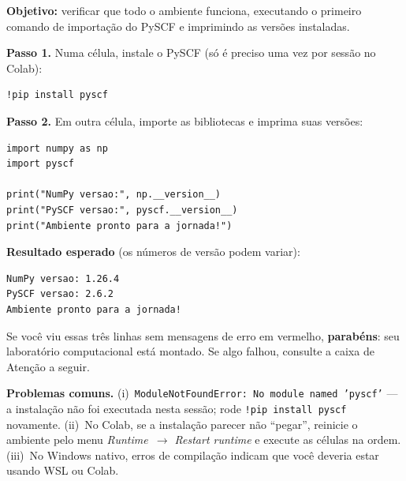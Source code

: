 \documentclass[11pt,a4paper,openany]{book}
\newcommand{\code}[1]{\texttt{#1}}
\newcommand{\pyscf}{\textsf{PySCF}}
\begin{document}
\begin{caixamaos}
\textbf{Objetivo:} verificar que todo o ambiente funciona, executando o primeiro
comando de importação do \pyscf{} e imprimindo as versões instaladas.

\vspace{0.4cm}
\textbf{Passo 1.} Numa célula, instale o \pyscf{} (só é preciso uma vez por
sessão no Colab):

\begin{lstlisting}[style=console]
!pip install pyscf
\end{lstlisting}

\textbf{Passo 2.} Em outra célula, importe as bibliotecas e imprima suas versões:

\begin{lstlisting}[style=python]
import numpy as np
import pyscf

print("NumPy versao:", np.__version__)
print("PySCF versao:", pyscf.__version__)
print("Ambiente pronto para a jornada!")
\end{lstlisting}

\textbf{Resultado esperado} (os números de versão podem variar):

\begin{lstlisting}[style=console]
NumPy versao: 1.26.4
PySCF versao: 2.6.2
Ambiente pronto para a jornada!
\end{lstlisting}

\vspace{0.2cm}
Se você viu essas três linhas sem mensagens de erro em vermelho,
\textbf{parabéns}: seu laboratório computacional está montado. Se algo falhou,
consulte a caixa de Atenção a seguir.
\end{caixamaos}

\begin{caixaatencao}
\textbf{Problemas comuns.} (i)~\code{ModuleNotFoundError: No module named 'pyscf'}
--- a instalação não foi executada nesta sessão; rode \code{!pip install pyscf}
novamente. (ii)~No Colab, se a instalação parecer não ``pegar'', reinicie o
ambiente pelo menu \emph{Runtime~$\rightarrow$ Restart runtime} e execute as
células na ordem. (iii)~No Windows nativo, erros de compilação indicam que você
deveria estar usando WSL ou Colab.
\end{caixaatencao}
\end{document}
